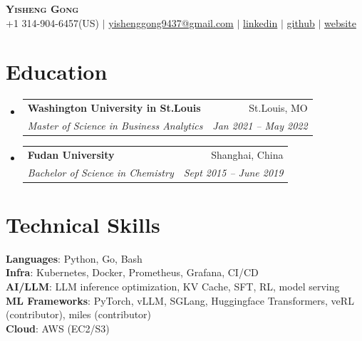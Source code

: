 \documentclass[letterpaper,11pt]{article}
\makeatletter
\newcommand{\resumeSubheading}[4]{
  \vspace{-2pt}\item
    \begin{tabular*}{0.97\textwidth}[t]{l@{\extracolsep{\fill}}r}
      \textbf{#1} & #2 \\
      \textit{\small#3} & \textit{\small #4} \\
    \end{tabular*}\vspace{-7pt}
}
\newcommand{\resumeSubHeadingListStart}{\begin{itemize}[leftmargin=0.15in, label={}]}
\newcommand{\resumeSubHeadingListEnd}{\end{itemize}}
\makeatother
\begin{document}

\begin{center}
    \textbf{\Huge \scshape Yisheng Gong} \\ \vspace{1pt}
    \small +1 314-904-6457(US) $|$ \href{mailto:yishenggong@9437.com}{{yishenggong9437@gmail.com}} $|$ \href{https://www.linkedin.com/in/yisheng-gong1997}{{linkedin}} $|$
    \href{https://www.github.com/gongyisheng}{{github}} $|$ \href{https://blog.yellowday.day}{{website}}
\end{center}


\section{Education}
  \resumeSubHeadingListStart
    \resumeSubheading
      {Washington University in St.Louis}{St.Louis, MO}
      {Master of Science in Business Analytics}{Jan 2021 -- May 2022}
    \resumeSubheading
      {Fudan University}{Shanghai, China}
      {Bachelor of Science in Chemistry }{Sept 2015 -- June 2019}
  \resumeSubHeadingListEnd

\section{Technical Skills}
 \begin{itemize}[leftmargin=0.15in, label={}]
    \small{\item{
     \textbf{Languages}{: Python, Go, Bash} \\
     \textbf{Infra}{: Kubernetes, Docker, Prometheus, Grafana, CI/CD} \\
     \textbf{AI/LLM}{: LLM inference optimization, KV Cache, SFT, RL, model serving} \\
     \textbf{ML Frameworks}{: PyTorch, vLLM, SGLang, Huggingface Transformers, veRL (contributor), miles (contributor)} \\
     \textbf{Cloud}{: AWS (EC2/S3)} \\
    }}
 \end{itemize}
\end{document}

